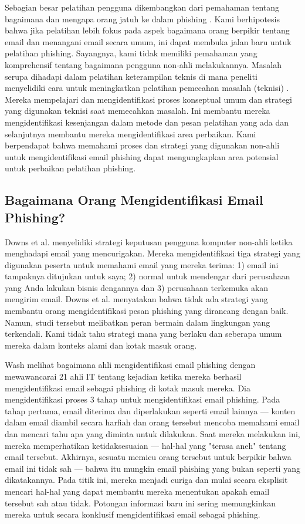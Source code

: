 \documentclass[lettersize,journal]{IEEEtran}
\begin{document}
Sebagian besar pelatihan pengguna dikembangkan dari pemahaman tentang bagaimana
dan mengapa orang jatuh ke dalam phishing \cite{enam}. Kami berhipotesis bahwa
jika pelatihan lebih fokus pada aspek bagaimana orang berpikir tentang email
dan menangani email secara umum, ini dapat membuka jalan baru untuk pelatihan
phishing. Sayangnya, kami tidak memiliki pemahaman yang komprehensif tentang
bagaimana pengguna non-ahli melakukannya. Masalah serupa dihadapi dalam
pelatihan keterampilan teknis di mana peneliti menyelidiki cara untuk
meningkatkan pelatihan pemecahan masalah (teknisi) \cite{satulima}. Mereka
mempelajari dan mengidentifikasi proses konseptual umum dan strategi yang
digunakan teknisi saat memecahkan masalah. Ini membantu mereka mengidentifikasi
kesenjangan dalam metode dan pesan pelatihan yang ada dan selanjutnya membantu
mereka mengidentifikasi area perbaikan. Kami berpendapat bahwa memahami proses
dan strategi yang digunakan non-ahli untuk mengidentifikasi email phishing
dapat mengungkapkan area potensial untuk perbaikan pelatihan phishing.

\subsection{Bagaimana Orang Mengidentifikasi Email Phishing?}

Downs et al. \cite{tujuh} menyelidiki strategi keputusan pengguna komputer
non-ahli ketika menghadapi email yang mencurigakan. Mereka mengidentifikasi
tiga strategi yang digunakan peserta untuk memahami email yang mereka terima:
1) email ini tampaknya ditujukan untuk saya; 2) normal untuk mendengar dari
perusahaan yang Anda lakukan bisnis dengannya dan 3) perusahaan terkemuka akan
mengirim email. Downs et al. \cite{tujuh} menyatakan bahwa tidak ada strategi
yang membantu orang mengidentifikasi pesan phishing yang dirancang dengan baik.
Namun, studi tersebut melibatkan peran bermain dalam lingkungan yang
terkendali. Kami tidak tahu strategi mana yang berlaku dan seberapa umum mereka
dalam konteks alami dan kotak masuk orang.

Wash \cite{tigaempat} melihat bagaimana ahli mengidentifikasi email phishing
dengan mewawancarai 21 ahli IT tentang kejadian ketika mereka berhasil
mengidentifikasi email sebagai phishing di kotak masuk mereka. Dia
mengidentifikasi proses 3 tahap untuk mengidentifikasi email phishing. Pada
tahap pertama, email diterima dan diperlakukan seperti email lainnya — konten
dalam email diambil secara harfiah dan orang tersebut mencoba memahami email
dan mencari tahu apa yang diminta untuk dilakukan. Saat mereka melakukan ini,
mereka memperhatikan ketidaksesuaian — hal-hal yang "terasa aneh" tentang email
tersebut. Akhirnya, sesuatu memicu orang tersebut untuk berpikir bahwa email
ini tidak sah — bahwa itu mungkin email phishing yang bukan seperti yang
dikatakannya. Pada titik ini, mereka menjadi curiga dan mulai secara eksplisit
mencari hal-hal yang dapat membantu mereka menentukan apakah email tersebut sah
atau tidak. Potongan informasi baru ini sering memungkinkan mereka untuk secara
konklusif mengidentifikasi email sebagai phishing.
\end{document}
